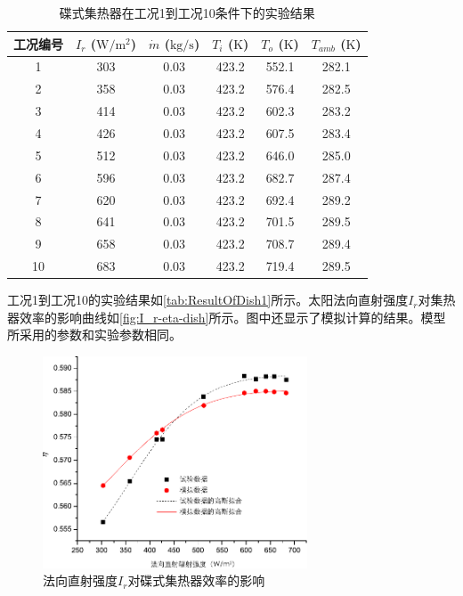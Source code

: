 \begin{table}[htbp]
	\caption{碟式集热器在工况1到工况10条件下的实验结果}
	\centering
	\begin{tabular}{cccccc}
		\toprule
		工况编号	& $I_r$ ($\mathrm{W/m^2}$)	&	$\dot{m}$ ($\mathrm{kg/s}$)			&	$T_i$ ($\mathrm{K}$)	&	$T_o$ ($\mathrm{K}$)		&	$T_{amb}$ ($\mathrm{K}$)\\
		\midrule
		1	&	303	&	0.03	&	423.2	&	552.1	&	282.1\\
		2	&	358	&	0.03	&	423.2	&	576.4	&	282.5\\
		3	&	414	&	0.03	&	423.2	&	602.3	&	283.2	\\
		4	&	426	&	0.03	&	423.2	&	607.5	&	283.4\\
		5	&	512	&	0.03	&	423.2	&	646.0	&	285.0\\
		6	&	596	&	0.03	&	423.2	&	682.7	&	287.4\\
		7	&	620	&	0.03	&	423.2	&	692.4	&	289.2\\
		8	&	641	&	0.03	&	423.2	&	701.5	&	289.5\\
		9	&	658	&	0.03	&	423.2	&	708.7	&	289.4\\
		10	&	683	&	0.03	&	423.2	&	719.4	&	289.5\\
		\bottomrule
	\end{tabular}
	\label{tab:ResultOfDish1}
\end{table}
工况1到工况10的实验结果如\autoref{tab:ResultOfDish1}所示。太阳法向直射强度$I_r$对集热器效率的影响曲线如\autoref{fig:I_r-eta-dish}所示。图中还显示了模拟计算的结果。模型所采用的参数和实验参数相同。
\begin{figure}[ht!]
\centering
\includegraphics[width=0.7\textwidth]{fig/I_r-eta-dish}
\caption{法向直射强度$I_r$对碟式集热器效率的影响}
\label{fig:I_r-eta-dish}
\end{figure}

